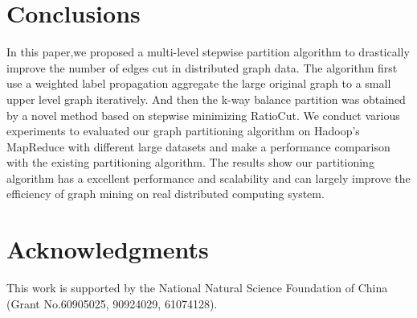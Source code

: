 \documentclass{acm_proc_article-sp}
\begin{document}
\section{Conclusions}
In this paper,we proposed a multi-level stepwise partition algorithm to drastically improve the number of edges cut in distributed graph data. The algorithm first use a weighted label propagation aggregate the large original graph to a small upper level graph iteratively. And then the k-way balance partition was obtained by a novel method based on stepwise minimizing RatioCut. We conduct various experiments to evaluated our graph partitioning algorithm on Hadoop's MapReduce with different large datasets and make a performance comparison with the existing partitioning algorithm. The results show our partitioning algorithm has a excellent performance and scalability and can largely improve the efficiency of graph mining on real distributed computing system.

\section{Acknowledgments}
This work is supported by the National Natural Science Foundation of China (Grant No.60905025, 90924029, 61074128).

%

%
%
\balancecolumns
\end{document}
